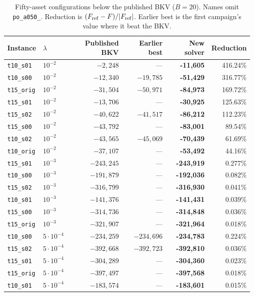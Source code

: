 \documentclass[a4paper]{article}
\begin{document}
\begin{table}[htbp]
\centering
\caption{Fifty-asset configurations below the published BKV (\(B=20\)). Names omit \texttt{po\_a050\_}.
Reduction is \((F_{\rm ref}-F)/|F_{\rm ref}|\). Earlier best is the first campaign's value where it beat the BKV.}
\label{tab:classical}
\begin{tabular}{@{}llrrrr@{}}
\toprule
Instance & \(\lambda\) & Published BKV & Earlier best & New solver & Reduction\\
\midrule
\texttt{t10\_s01}  & \(10^{-2}\) & \(-2{,}248\)  & ---           & \textbf{-11,605} & 416.24\%\\
\texttt{t10\_s00}  & \(10^{-2}\) & \(-12{,}340\) & \(-19{,}785\) & \textbf{-51,429} & 316.77\%\\
\texttt{t15\_orig} & \(10^{-2}\) & \(-31{,}504\) & \(-50{,}971\) & \textbf{-84,973} & 169.72\%\\
\texttt{t15\_s01}  & \(10^{-2}\) & \(-13{,}706\) & ---           & \textbf{-30,925} & 125.63\%\\
\texttt{t15\_s02}  & \(10^{-2}\) & \(-40{,}622\) & \(-41{,}517\) & \textbf{-86,212} & 112.23\%\\
\texttt{t15\_s00}  & \(10^{-2}\) & \(-43{,}792\) & ---           & \textbf{-83,001} & 89.54\%\\
\texttt{t10\_s02}  & \(10^{-2}\) & \(-43{,}565\) & \(-45{,}069\) & \textbf{-70,439} & 61.69\%\\
\texttt{t10\_orig} & \(10^{-2}\) & \(-37{,}107\) & ---           & \textbf{-53,492} & 44.16\%\\
\texttt{t15\_s01}  & \(10^{-3}\) & \(-243{,}245\) & ---          & \textbf{-243,919} & 0.277\%\\
\texttt{t10\_s00}  & \(10^{-3}\) & \(-191{,}879\) & ---          & \textbf{-192,036} & 0.082\%\\
\texttt{t15\_s02}  & \(10^{-3}\) & \(-316{,}799\) & ---          & \textbf{-316,930} & 0.041\%\\
\texttt{t10\_s01}  & \(10^{-3}\) & \(-141{,}376\) & ---          & \textbf{-141,431} & 0.039\%\\
\texttt{t15\_s00}  & \(10^{-3}\) & \(-314{,}736\) & ---          & \textbf{-314,848} & 0.036\%\\
\texttt{t15\_orig} & \(10^{-3}\) & \(-321{,}907\) & ---          & \textbf{-321,964} & 0.018\%\\
\texttt{t10\_s00}  & \(5\cdot10^{-4}\) & \(-234{,}259\) & \(-234{,}696\) & \textbf{-234,783} & 0.224\%\\
\texttt{t15\_s02}  & \(5\cdot10^{-4}\) & \(-392{,}668\) & \(-392{,}723\) & \textbf{-392,810} & 0.036\%\\
\texttt{t15\_s01}  & \(5\cdot10^{-4}\) & \(-304{,}289\) & ---          & \textbf{-304,360} & 0.023\%\\
\texttt{t15\_orig} & \(5\cdot10^{-4}\) & \(-397{,}497\) & ---          & \textbf{-397,568} & 0.018\%\\
\texttt{t10\_s01}  & \(5\cdot10^{-4}\) & \(-183{,}574\) & ---          & \textbf{-183,601} & 0.015\%\\
\bottomrule
\end{tabular}
\end{table}
\end{document}
